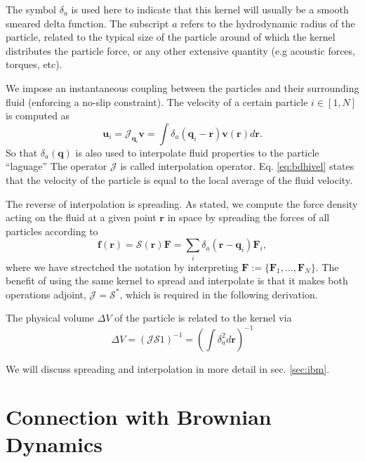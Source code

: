 \documentclass[ twoside,openright,titlepage,numbers=noenddot,%
headinclude,footinclude,cleardoublepage=empty,abstract=on,
BCOR=5mm,paper=a4,fontsize=11pt, dvipsnames
]{scrreprt}
\renewcommand{\vec}[1]{\bm{#1}}
\newcommand{\oper}[1]{\mathcal{#1}}
\newcommand{\ppos}{q}
\newcommand{\pvel}{u}
\newcommand{\fpos}{r}
\newcommand{\fvel}{v}
\begin{document}
The symbol $\delta_a$ is used here to indicate that this kernel will usually be a smooth smeared delta function. The subscript $a$ refers to the hydrodynamic radius of the particle, related to the typical size of the particle around of which the kernel distributes the particle force, or any other extensive quantity (e.g acoustic forces\cite{Balboa2013}, torques, etc).

We impose an instantaneous coupling between the particles and their surrounding fluid (enforcing a no-slip constraint). The velocity of a certain particle $i\in [1,N]$ is computed as
\begin{equation}
  \label{eq:bdhifvel}
  \vec{\pvel}_i= \oper{J}_{\vec{\ppos}_i}\vec{\fvel} =\int{\delta_a(\vec{\ppos}_i - \vec{\fpos})\vec{\fvel}(\vec{\fpos})d\vec{\fpos}}.
\end{equation}
So that $\delta_a(\vec{\ppos})$ is also used  to interpolate fluid properties to the particle ``laguage''
The operator $\oper{J}$ is called interpolation operator. Eq. \eqref{eq:bdhivel} states that the velocity of the particle is equal to the local average of the fluid velocity.

The reverse of interpolation is spreading. As stated, we compute the force density acting on the fluid at a given point $\vec{\fpos}$ in space by spreading the forces of all particles according to
\begin{equation}
  \label{eq:spreadoper}
  \vec{f}(\vec{\fpos}) = \oper{S}(\vec{\fpos})\vec{F} = \sum_i\delta_a(\vec{\fpos}-\vec{\ppos}_i)\vec{F}_i,
\end{equation}
where we have strectched the notation by interpreting $\vec{F} := \{\vec{F}_1,\dots,\vec{F}_N\}$.
The benefit of using the same kernel to spread and interpolate is that it makes both operations adjoint, $\oper{J} = \oper{S}^*$, which is required in the following derivation\cite{Delong2014}.

The physical volume $\Delta V$ of the particle is related to the kernel via
\begin{equation}
  \Delta V = (\oper{J}\oper{S}1)^{-1} = \left(\int\delta_a^2d\vec{r}\right)^{-1}
\end{equation}

We will discuss spreading and interpolation in more detail in sec. \ref{sec:ibm}.

\section{Connection with Brownian Dynamics}\label{sec:bdhicon}
\end{document}
